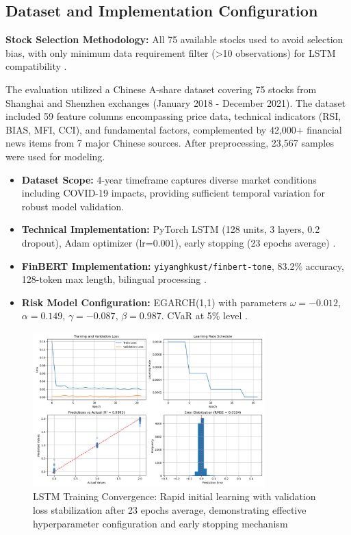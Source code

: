 \documentclass[3p,times,procedia]{elsarticle}
\begin{document}
\subsection{Dataset and Implementation Configuration}

\textbf{Stock Selection Methodology:} All 75 available stocks used to avoid selection bias, with only minimum data requirement filter (>10 observations) for LSTM compatibility \cite{FinReportDataset2025}.

The evaluation utilized a Chinese A-share dataset covering 75 stocks from Shanghai and Shenzhen exchanges (January 2018 - December 2021). The dataset included 59 feature columns encompassing price data, technical indicators (RSI, BIAS, MFI, CCI), and fundamental factors, complemented by 42,000+ financial news items from 7 major Chinese sources. After preprocessing, 23,567 samples were used for modeling.

\begin{itemize}\setlength{\itemsep}{1pt}
\item \textbf{Dataset Scope:} 4-year timeframe captures diverse market conditions including COVID-19 impacts, providing sufficient temporal variation for robust model validation.

\item \textbf{Technical Implementation:} PyTorch LSTM (128 units, 3 layers, 0.2 dropout), Adam optimizer (lr=0.001), early stopping (23 epochs average) \cite{Kingma2015}.

\item \textbf{FinBERT Implementation:} \texttt{yiyanghkust/finbert-tone}, 83.2\% accuracy, 128-token max length, bilingual processing \cite{Araci2019}.

\item \textbf{Risk Model Configuration:} EGARCH(1,1) with parameters $\omega=-0.012$, $\alpha=0.149$, $\gamma=-0.087$, $\beta=0.987$. CVaR at 5\% level \cite{Nelson1991}.
\end{itemize}

\begin{figure}[!ht]
    \centering
    \includegraphics[width=0.80\textwidth]{Picture2.png}
    \caption{LSTM Training Convergence: Rapid initial learning with validation loss stabilization after 23 epochs average, demonstrating effective hyperparameter configuration and early stopping mechanism}
    \label{fig:learning_curve}
\end{figure}
\end{document}
